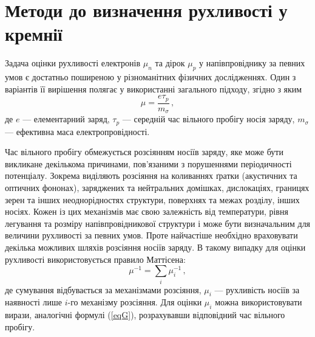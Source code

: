 \documentclass[10pt,a5paper,titlepage,oneside]{book}
\numberwithin{equation}{part}
\begin{document}

\renewcommand\bibname{Список використаних джерел}
\renewcommand{\tablename}{Табл.}

\setcounter{chapter}{1}
\setcounter{section}{1}

\section{Методи до визначення рухливості у кремнії}

Задача оцінки рухливості електронів $\mu_n$ та дірок $\mu_p$ у напівпровіднику
за певних умов є достатньо поширеною у різноманітних фізичних дослідженнях.
Один з варіантів її вирішення полягає у використанні загального підходу, згідно з яким
\begin{equation}\label{eqG}
  \mu=\frac{e\tau_p}{m_\sigma}\,,
\end{equation}
де
$e$ --- елементарний заряд,
$\tau_p$ --- середній час вільного пробігу носія заряду,
$m_\sigma$ --- ефективна маса електропровідності.

Час вільного пробігу обмежується розсіянням носіїв заряду, яке може бути викликане декількома причинами,
пов'язаними з порушеннями періодичності потенціалу.
Зокрема виділяють розсіяння на коливаннях ґратки (акустичних та оптичних фононах), заряджених та нейтральних домішках,
дислокаціях, границях зерен та інших неоднорідностях структури, поверхнях та межах розділу, інших носіях.
Кожен із цих механізмів має свою залежність від температури, рівня легування та розміру напівпровідникової структури
і може бути визначальним для величини рухливості за певних умов.
Проте найчастіше необхідно враховувати декілька можливих шляхів розсіяння носіїв заряду.
В такому випадку для оцінки рухливості використовується правило Маттісена:
\begin{equation}\label{eqM}
  \mu^{-1}=\sum_i \mu_i^{-1}\,,
\end{equation}
де
сумування відбувається за механізмами розсіяння,
$\mu_i$ --- рухливість носіїв за наявності лише $i$-го механізму розсіяння.
Для оцінки $\mu_i$ можна використовувати вирази, аналогічні формулі (\ref{eqG}), розрахувавши відповідний час вільного пробігу.
\end{document}

